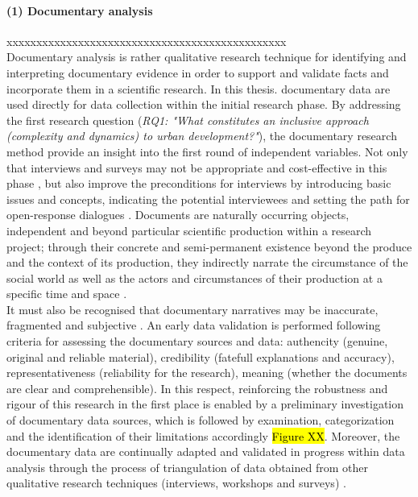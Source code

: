 \documentclass[11pt]{report}
\begin{document}
\paragraph{(1) Documentary analysis} xxxxxxxxxxxxxxxxxxxxxxxxxxxxxxxxxxxxxxxxxxxxxxx
\\
Documentary analysis is rather qualitative research technique for identifying and interpreting documentary evidence in order to support and validate facts and incorporate them in a scientific research. In this thesis. documentary data are  used directly for data collection within the initial research phase. By addressing the first research question (\textit{RQ1: "What constitutes an inclusive approach (complexity and dynamics) to urban development?"}), the documentary research method provide an insight into the first round of independent variables. Not only that interviews and surveys may not be appropriate and cost-effective in this phase , but also
improve the preconditions for interviews by introducing basic issues and concepts, indicating the potential interviewees and setting the path for open-response dialogues . Documents are naturally occurring objects, independent and beyond particular scientific production within a research project; through their concrete and semi-permanent existence beyond the produce and the context of its production, they indirectly narrate the circumstance of the social world as well as the actors and circumstances of their production at a specific time and space .
\\
It must also be recognised that documentary narratives may be inaccurate, fragmented and subjective . An early data validation is performed following  criteria for assessing the documentary sources and data: authencity (genuine, original and reliable material), credibility (fatefull explanations and accuracy), representativeness (reliability for the research), meaning (whether the documents are clear and comprehensible). In this respect, reinforcing the robustness and rigour of this research in the first place is enabled by a preliminary investigation of documentary data sources, which is followed by examination, categorization and the identification of their limitations accordingly  \hl{Figure XX}. Moreover, the documentary data are continually adapted and validated in progress within data analysis through the process of triangulation of data obtained from other qualitative research techniques (interviews, workshops and surveys) .
\end{document}
